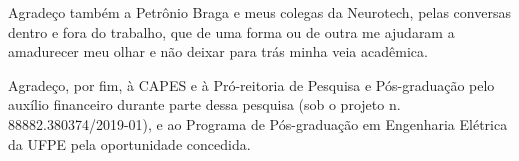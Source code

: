Agrade\c co tamb\'em a Petr\^onio Braga e meus colegas da Neurotech, pelas conversas dentro e fora do trabalho, que de uma forma ou de outra me ajudaram a amadurecer meu olhar e n\~ao deixar para tr\'as minha veia acad\^emica.

Agrade\c co, por fim, \`a CAPES e \`a Pr\'o-reitoria de Pesquisa e P\'os-gradua\c c\~ao pelo aux\'ilio financeiro durante parte dessa pesquisa (sob o projeto n. 88882.380374/2019-01), e ao Programa de P\'os-gradua\c c\~ao em Engenharia El\'etrica da UFPE pela oportunidade concedida.
